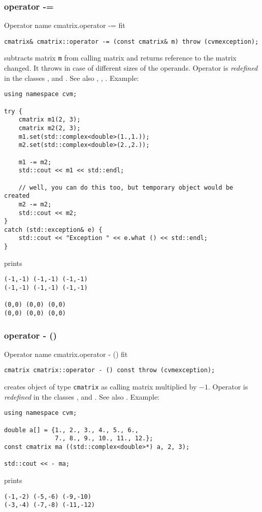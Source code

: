 \subsubsection{operator -=}
Operator%
\pdfdest name {cmatrix.operator -=} fit
\begin{verbatim}
cmatrix& cmatrix::operator -= (const cmatrix& m) throw (cvmexception);
\end{verbatim}
subtracts  matrix \verb"m" from  calling matrix
and returns  reference to
the matrix changed.
It throws  
in case of different sizes of the operands.
Operator is \emph{redefined} in the classes
,  
and .
See also ,
,
.
Example:
\begin{Verbatim}
using namespace cvm;

try {
    cmatrix m1(2, 3);
    cmatrix m2(2, 3);
    m1.set(std::complex<double>(1.,1.));
    m2.set(std::complex<double>(2.,2.));

    m1 -= m2;
    std::cout << m1 << std::endl;

    // well, you can do this too, but temporary object would be created
    m2 -= m2; 
    std::cout << m2;
}
catch (std::exception& e) {
    std::cout << "Exception " << e.what () << std::endl;
}
\end{Verbatim}
prints
\begin{Verbatim}
(-1,-1) (-1,-1) (-1,-1)
(-1,-1) (-1,-1) (-1,-1)

(0,0) (0,0) (0,0)
(0,0) (0,0) (0,0)
\end{Verbatim}
\newpage



\subsubsection{operator - ()}
Operator%
\pdfdest name {cmatrix.operator - ()} fit
\begin{verbatim}
cmatrix cmatrix::operator - () const throw (cvmexception);
\end{verbatim}
creates  object of type \verb"cmatrix" as
 calling matrix multiplied by $-1$.
Operator is \emph{redefined} in the classes
,  
and .
See also .
Example:
\begin{Verbatim}
using namespace cvm;

double a[] = {1., 2., 3., 4., 5., 6.,
              7., 8., 9., 10., 11., 12.};
const cmatrix ma ((std::complex<double>*) a, 2, 3);

std::cout << - ma;
\end{Verbatim}
prints
\begin{Verbatim}
(-1,-2) (-5,-6) (-9,-10)
(-3,-4) (-7,-8) (-11,-12)
\end{Verbatim}
\newpage




